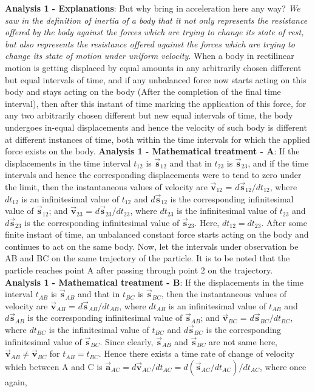 \begin{flushright}
\begin{minipage}[h]{10.5cm}
{\small

\textbf{Analysis 1 - Explanations}: But why bring in acceleration here any way? \textit{We saw in the definition of inertia of a body that it not only represents the resistance offered by the body against the forces which are trying to change its state of rest, but also represents the resistance offered against the forces which are trying to change its state of motion under uniform velocity}. When a body in rectilinear motion is getting displaced by equal amounts in any arbitrarily chosen different but equal intervals of time, and if any unbalanced force now starts acting on this body and stays acting on the body (After the completion of the final time interval), then after this instant of time marking the application of this force, for any two arbitrarily chosen different but new equal intervals of time, the body undergoes in-equal displacements and hence the velocity of such body is different at different instances of time, both within the time intervals for which the applied force exists on the body. \textbf{Analysis 1 - Mathematical treatment - A}: If the displacements in the time interval $t_{12}$ is $\vec{\mathbf{s}}_{12}$  and that in $t_{23}$ is $\vec{\mathbf{s}}_{23}$, and if the time intervals and hence the corresponding displacements were to tend to zero under the limit, then the instantaneous values of velocity are $\vec{\mathbf{v}}_{12}$ = $d\vec{\mathbf{s}}_{12}/dt_{12}$, where $dt_{12}$ is an infinitesimal value of $t_{12}$ and $d\vec{\mathbf{s}}_{12}$ is the corresponding infinitesimal value of $\vec{\mathbf{s}}_{12}$; and $\vec{\mathbf{v}}_{23}$ = $d\vec{\mathbf{s}}_{23}/dt_{23}$, where $dt_{23}$ is the infinitesimal value of $t_{23}$ and $d\vec{\mathbf{s}}_{23}$ is the corresponding infinitesimal value of $\vec{\mathbf{s}}_{23}$. Here, $dt_{12}=dt_{23}$. After some finite instant of time, an unbalanced constant force starts acting on the body and continues to act on the same body. Now, let the intervals under observation be AB and BC on the same trajectory of the particle. It is to be noted that the particle reaches point A after passing through point 2 on the trajectory. \textbf{Analysis 1 - Mathematical treatment - B}: If the displacements in the time interval $t_{AB}$ is $\vec{\mathbf{s}}_{AB}$  and that in $t_{BC}$ is $\vec{\mathbf{s}}_{BC}$, then the instantaneous values of velocity are $\vec{\mathbf{v}}_{AB}$ = $d\vec{\mathbf{s}}_{AB}/dt_{AB}$, where $dt_{AB}$ is an infinitesimal value of $t_{AB}$ and $d\vec{\mathbf{s}}_{AB}$ is the corresponding infinitesimal value of $\vec{\mathbf{s}}_{AB}$; and $\vec{\mathbf{v}}_{BC}$ = $d\vec{\mathbf{s}}_{BC}/dt_{BC}$, where $dt_{BC}$ is the infinitesimal value of $t_{BC}$ and $d\vec{\mathbf{s}}_{BC}$ is the corresponding infinitesimal value of $\vec{\mathbf{s}}_{BC}$. Since clearly, $\vec{\mathbf{s}}_{AB}$ and $\vec{\mathbf{s}}_{BC}$ are not same here, $\vec{\mathbf{v}}_{AB} \ne \vec{\mathbf{v}}_{BC}$ for $t_{AB} = t_{BC}$. Hence there exists a time rate of change of velocity which between A and C is $\vec{\mathbf{a}}_{AC} = d\vec{\mathbf{v}}_{AC}/dt_{AC} = d(\vec{\mathbf{s}}_{AC}/dt_{AC})/dt_{AC}$, where once again, }
\end{minipage}
\end{flushright}
